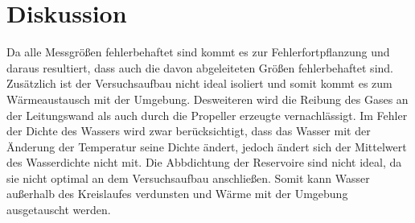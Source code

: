 \section{Diskussion}
\label{sec:Diskussion}
Da alle Messgrößen fehlerbehaftet sind kommt es zur Fehlerfortpflanzung und daraus resultiert, dass auch die davon abgeleiteten Größen fehlerbehaftet sind. Zusätzlich ist der Versuchsaufbau nicht ideal isoliert und somit kommt es zum Wärmeaustausch mit der Umgebung. Desweiteren wird die Reibung des Gases an der Leitungswand als auch durch die Propeller erzeugte vernachlässigt. Im Fehler der Dichte des Wassers wird zwar berücksichtigt, dass das Wasser mit der Änderung der Temperatur seine Dichte ändert, jedoch ändert sich der Mittelwert des Wasserdichte nicht mit. Die Abbdichtung der Reservoire sind nicht ideal, da sie nicht optimal an dem Versuchsaufbau anschließen. Somit kann Wasser außerhalb des Kreislaufes verdunsten und Wärme mit der Umgebung ausgetauscht werden.

